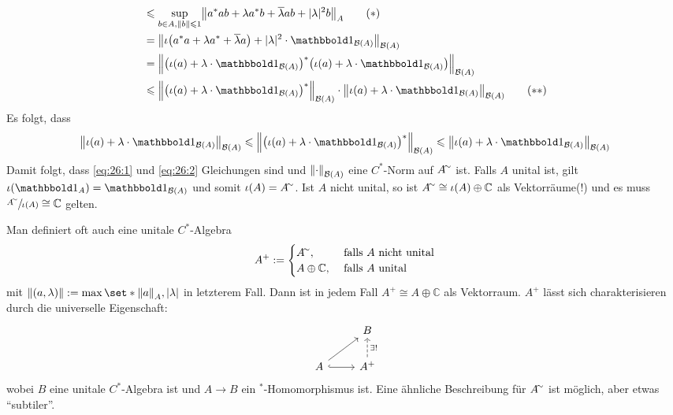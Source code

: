 \begin{beweis}
\begin{align}
		&\le \sup_{b \in A, \norm{b} \le 1} \norm[\big]{a^*ab + \lambda a^* b + \overline{\lambda} a b + \abs{\lambda}^2 b }_A \tag{$*$} \label{eq:26:1}\\
		&= \norm[\big]{\iota \enbrace*{a^* a + \lambda a^* + \overline{\lambda} a} + \abs{\lambda}^2 \cdot \ind_{\mathcal{B}(A)} }_{\mathcal{B}(A)} \\
		&= \norm*{ \enbrace*{\iota(a) + \lambda \cdot \ind_{\mathcal{B}(A)}}^* \enbrace*{\iota(a) + \lambda \cdot \ind_{\mathcal{B}(A)}}}_{\mathcal{B}(A)} \\
		&\le \norm*{\enbrace*{\iota(a) + \lambda \cdot \ind_{\mathcal{B}(A)}}^*}_{\mathcal{B}(A)}\cdot\norm*{\iota(a) + \lambda \cdot \ind_{\mathcal{B}(A)}}_{\mathcal{B}(A)} \tag{$**$} \label{eq:26:2}
	\end{align}
	Es folgt, dass 
	\begin{align}
		\norm*{\iota(a) + \lambda \cdot \ind_{\mathcal{B}(A)}}_{\mathcal{B}(A)} \le \norm*{\enbrace*{\iota(a) + \lambda \cdot \ind_{\mathcal{B}(A)}}^*}_{\mathcal{B}(A)}
		\le \norm*{\iota(a) + \lambda \cdot \ind_{\mathcal{B}(A)}}_{\mathcal{B}(A)} 
	\end{align}
	Damit folgt, dass \eqref{eq:26:1} und \eqref{eq:26:2} Gleichungen sind und $\norm*{\cdot }_{\mathcal{B}(A)}$ eine $C^*$-Norm auf $A^\simm$ ist. Falls $A$ unital ist, gilt
	$\iota(\ind_A) = \ind_{\mathcal{B}(A)}$ und somit $\iota(A)=A^\simm$. Ist $A$ nicht unital, so ist $A^\simm \cong \iota(A) \oplus \mathbb{C}$ als Vektorräume(!) und es muss
	$\sfrac{A^\simm}{\iota(A)}\cong \mathbb{C}$ gelten.
\end{beweis}

\begin{bemerkung}[{name=[Alternative Unitalisierung]},label=bem:27]
	Man definiert oft auch eine unitale $C^*$-Algebra 
	\[
		A^+ := \begin{cases}
			A^\simm, &\text{ falls }A \text{ nicht unital} \\
			A  \oplus \mathbb{C} , &\text{ falls } A \text{ unital} 
		\end{cases}
	\]
	mit $\norm*{(a,\lambda)} := \max \set*{\norm*{a}_A, \abs{\lambda}}$ in letzterem Fall. 
	Dann ist in jedem Fall $A^+ \cong A \oplus \mathbb{C}$ als Vektorraum. 
	$A^+$ lässt sich charakterisieren durch die universelle Eigenschaft:
	\[
		\begin{tikzcd}
			\mbox{ } & B \\
			A \rar[hook] \urar& A^+ \uar[dashed,"\exists !"']
		\end{tikzcd}
	\]
	wobei $B$ eine unitale $C^*$-Algebra ist und $A \to B$ ein ${}^*$-Homomorphismus ist. Eine ähnliche Beschreibung für $A^\simm$ ist möglich, aber etwas \enquote{subtiler}.
\end{bemerkung}

